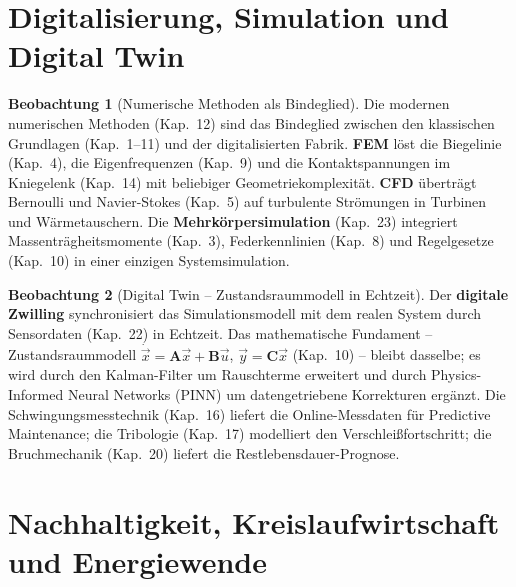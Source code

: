﻿\documentclass[a4paper,12pt]{report}
\theoremstyle{definition}
\newtheorem{beobachtung}{Beobachtung}
\begin{document}
\section{Digitalisierung, Simulation und Digital Twin}

\begin{beobachtung}[Numerische Methoden als Bindeglied]
Die modernen numerischen Methoden (Kap.~12) sind das Bindeglied zwischen
den klassischen Grundlagen (Kap.~1--11) und der digitalisierten Fabrik.
\textbf{FEM} löst die Biegelinie (Kap.~4), die Eigenfrequenzen (Kap.~9)
und die Kontaktspannungen im Kniegelenk (Kap.~14) mit beliebiger
Geometriekomplexität. \textbf{CFD} überträgt Bernoulli und Navier-Stokes (Kap.~5)
auf turbulente Strömungen in Turbinen und Wärmetauschern. Die
\textbf{Mehrkörpersimulation} (Kap.~23) integriert Massenträgheitsmomente
(Kap.~3), Federkennlinien (Kap.~8) und Regelgesetze (Kap.~10)
in einer einzigen Systemsimulation.
\end{beobachtung}

\begin{beobachtung}[Digital Twin -- Zustandsraummodell in Echtzeit]
Der \textbf{digitale Zwilling} synchronisiert das Simulationsmodell
mit dem realen System durch Sensordaten (Kap.~22) in Echtzeit.
Das mathematische Fundament -- Zustandsraummodell
$\dot{\vec{x}} = \mathbf{A}\vec{x} + \mathbf{B}\vec{u}$,
$\vec{y} = \mathbf{C}\vec{x}$ (Kap.~10) -- bleibt dasselbe;
es wird durch den Kalman-Filter um Rauschterme erweitert
und durch Physics-Informed Neural Networks (PINN) um
datengetriebene Korrekturen ergänzt. Die Schwingungsmesstechnik (Kap.~16)
liefert die Online-Messdaten für Predictive Maintenance;
die Tribologie (Kap.~17) modelliert den Verschleißfortschritt;
die Bruchmechanik (Kap.~20) liefert die Restlebensdauer-Prognose.
\end{beobachtung}

\section{Nachhaltigkeit, Kreislaufwirtschaft und Energiewende}
\end{document}

